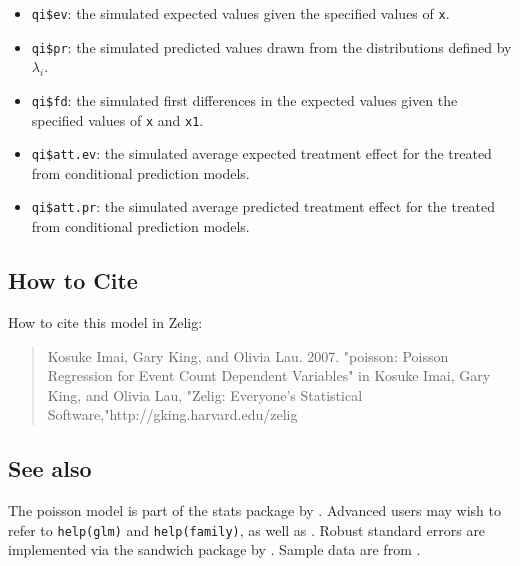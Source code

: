 \documentclass{article}
\begin{document}
\begin{itemize}
   \begin{itemize}
   \item {\tt qi\$ev}: the simulated expected values given the
     specified values of {\tt x}.
   \item {\tt qi\$pr}: the simulated predicted values drawn from the
     distributions defined by $\lambda_i$.
   \item {\tt qi\$fd}: the simulated first differences in the expected
     values given the specified values of {\tt x} and {\tt x1}.
   \item {\tt qi\$att.ev}: the simulated average expected treatment
     effect for the treated from conditional prediction models.  
   \item {\tt qi\$att.pr}: the simulated average predicted treatment
     effect for the treated from conditional prediction models.  
   \end{itemize}
\end{itemize}

\subsection* {How to Cite} 

How to cite this model in Zelig:
\begin{verse}
  Kosuke Imai, Gary King, and Olivia Lau. 2007. "poisson: Poisson Regression for Event Count Dependent Variables" in Kosuke Imai, Gary King, and Olivia Lau, "Zelig: Everyone's Statistical Software,"http://gking.harvard.edu/zelig
\end{verse}
\CiteZelig
\subsection* {See also}
The poisson model is part of the stats package by \citet{VenRip02}.
Advanced users may wish to refer to \texttt{help(glm)} and
\texttt{help(family)}, as well as \cite{McCNel89}. Robust standard
errors are implemented via the sandwich package by \citet{Zeileis04}.
Sample data are from \cite{Martin92}.



 
\end{document}
